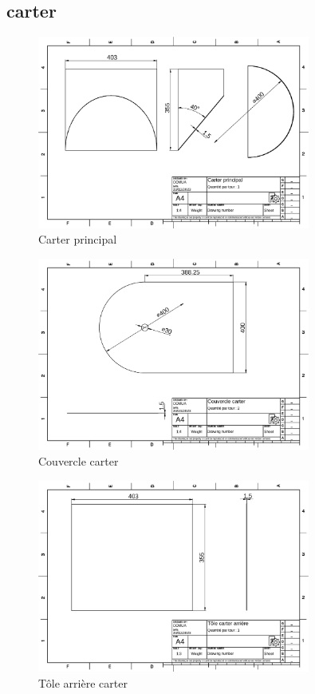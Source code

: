 \documentclass[a4paper]{article}
\begin{document}
\subsection{carter}
\begin{figure}[H]
    \centering
    \includegraphics*[width=0.8\textwidth]{../plans/carter-principal}
    \caption{Carter principal}
    \label{fig:carter-principal}
\end{figure}
\begin{figure}[H]
    \centering
    \includegraphics*[width=0.8\textwidth]{../plans/couvercle-carter}
    \caption{Couvercle carter}
    \label{fig:couvercle-carter}
\end{figure}
\begin{figure}[H]
    \centering
    \includegraphics*[width=0.8\textwidth]{../plans/tole-carter-arriere}
    \caption{Tôle arrière carter}
    \label{fig:tole-carter-arriere}
\end{figure}
\end{document}
